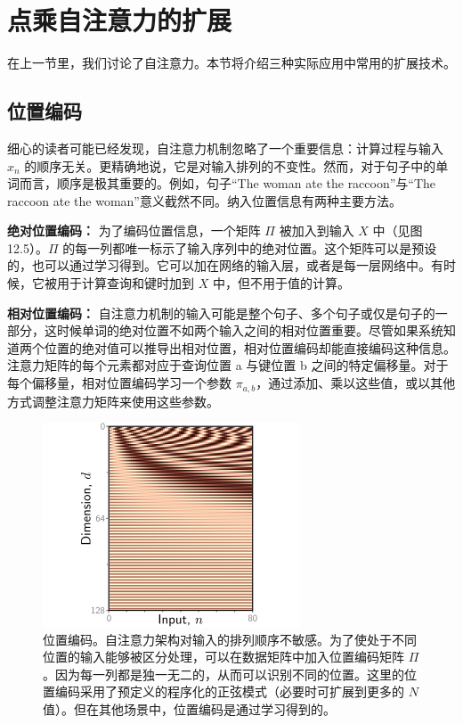 \section{点乘自注意力的扩展}
在上一节里，我们讨论了自注意力。本节将介绍三种实际应用中常用的扩展技术。

\subsection{位置编码}
细心的读者可能已经发现，自注意力机制忽略了一个重要信息：计算过程与输入 \(x_n\) 的顺序无关。更精确地说，它是对输入排列的不变性。然而，对于句子中的单词而言，顺序是极其重要的。例如，句子“The woman ate the raccoon”与“The raccoon ate the woman”意义截然不同。纳入位置信息有两种主要方法。

\textbf{绝对位置编码：} 为了编码位置信息，一个矩阵 \(\Pi\) 被加入到输入 \(X\) 中（见图 12.5）。\(\Pi\) 的每一列都唯一标示了输入序列中的绝对位置。这个矩阵可以是预设的，也可以通过学习得到。它可以加在网络的输入层，或者是每一层网络中。有时候，它被用于计算查询和键时加到 \(X\) 中，但不用于值的计算。

\textbf{相对位置编码：} 自注意力机制的输入可能是整个句子、多个句子或仅是句子的一部分，这时候单词的绝对位置不如两个输入之间的相对位置重要。尽管如果系统知道两个位置的绝对值可以推导出相对位置，相对位置编码却能直接编码这种信息。注意力矩阵的每个元素都对应于查询位置 a 与键位置 b 之间的特定偏移量。对于每个偏移量，相对位置编码学习一个参数 \(\pi_{a,b}\)，通过添加、乘以这些值，或以其他方式调整注意力矩阵来使用这些参数。

\begin{figure}[ht!]
\centering
\includegraphics[width=0.7\linewidth]{png/chapter12/TransformerPE.png}
\caption{位置编码。自注意力架构对输入的排列顺序不敏感。为了使处于不同位置的输入能够被区分处理，可以在数据矩阵中加入位置编码矩阵 \(\Pi\)。因为每一列都是独一无二的，从而可以识别不同的位置。这里的位置编码采用了预定义的程序化的正弦模式（必要时可扩展到更多的 \(N\) 值）。但在其他场景中，位置编码是通过学习得到的。}
\end{figure}


